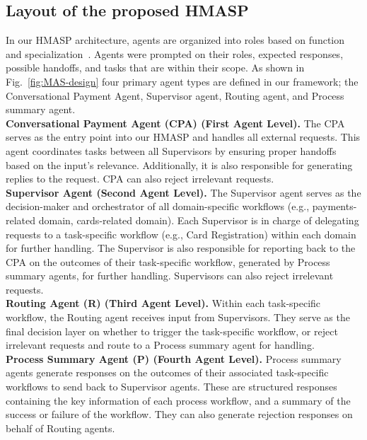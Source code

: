 \documentclass[runningheads]{llncs}
\begin{document}
\subsection{Layout of the proposed HMASP} 
In our HMASP architecture, agents are organized into roles based on function and specialization~\cite{guo2024mascollab,hong2024metagpt,tran2025mascollab,wang2024surveyllm-mas}. Agents were prompted on their roles, expected responses, possible handoffs, and tasks that are within their scope.
As shown in Fig.~\ref{fig:MAS-design} four primary agent types are defined in our framework; the Conversational Payment Agent, Supervisor agent, Routing agent, and Process summary agent.\\

\noindent\textbf{Conversational Payment Agent (CPA) (First Agent Level).}
The CPA serves as the entry point into our HMASP and handles all external requests. This agent coordinates tasks between all Supervisors by ensuring proper handoffs based on the input's relevance. Additionally, it is also responsible for generating replies to the request. CPA can also reject irrelevant requests.\\%

\noindent\textbf{Supervisor Agent (Second Agent Level).}
The Supervisor agent serves as the decision-maker and orchestrator of all domain-specific workflows (e.g., payments-related domain, cards-related domain). Each Supervisor is in charge of delegating requests to a task-specific workflow (e.g., Card Registration) within each domain for further handling. The Supervisor is also responsible for reporting back to the CPA on the outcomes of their task-specific workflow, generated by Process summary agents, for further handling. Supervisors can also reject irrelevant requests.\\

\noindent\textbf{Routing Agent (R) (Third Agent Level).}
Within each task-specific workflow, the Routing agent receives input from Supervisors. They serve as the final decision layer on whether to trigger the task-specific workflow, or reject irrelevant requests and route to a Process summary agent for handling.\\ 

\noindent\textbf{Process Summary Agent (P) (Fourth Agent Level).} 
Process summary agents generate responses on the outcomes of their associated task-specific workflows to send back to Supervisor agents. These are structured responses containing the key information of each process workflow, and a summary of the success or failure of the workflow. They can also generate rejection responses on behalf of Routing agents.\\
\end{document}
